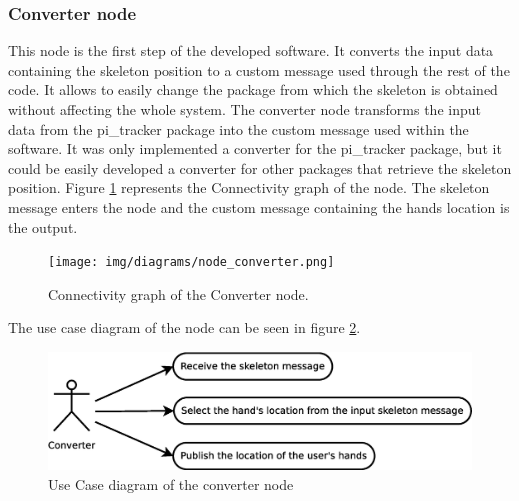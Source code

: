 




\subsubsection{Converter node}
		\label{converter}

	This node is the first step of the developed software. 
	It converts the input data containing the skeleton position to a custom message used through the rest of the code. 
	It allows to easily change the package from which the skeleton is obtained without affecting the whole system. 
	The converter node transforms the input data from the pi\_tracker package into the custom message used within the software. 
	It was only implemented a converter for the pi\_tracker package, but it could be easily developed a converter for other packages that retrieve the skeleton position. 
	Figure \ref{node_converter} represents the Connectivity graph of the node. 
	The skeleton message enters the node and the custom message containing the hands location is the output. 

		\begin{figure}[H]
			\begin{center}
			\texttt{[image: img/diagrams/node\_converter.png]}
			\caption[Converter node I/O]{Connectivity graph of the Converter node.}		
			\label{node_converter}
			\end{center}
		\end{figure}

	The use case diagram of the node can be seen in figure \ref{uc_converter}. 

	\begin{figure}[H]
		\centering
		\includegraphics[scale=0.4]{img/diagrams/uc_converter.eps}
		\caption[Use case diagram converter node]{Use Case diagram of the converter node}
		\label{uc_converter}
	\end{figure}

